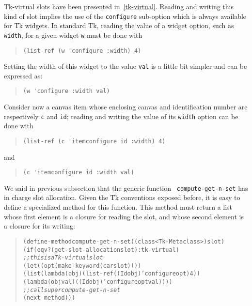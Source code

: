 {Tk-virtual slots have been presented in~\ref{tk-virtual}. Reading and
writing this kind of slot implies the use of the {\tt configure} sub-option
which is always available for Tk widgets. In standard Tk, reading the value
of a widget option, such as {\tt width}, for a given widget {\tt w} must
be done with
\begin{quote}\figsize
\begin{verbatim}
(list-ref (w 'configure :width) 4)
\end{verbatim}
\end{quote}
\noindent
Setting the width of this widget to the value {\tt val} is a little
bit simpler and can be expressed as:
\begin{quote}\figsize
\begin{verbatim}
(w 'configure :width val)
\end{verbatim}
\end{quote}

\noindent
Consider now a canvas item whose enclosing canvas and identification number
are respectively {\tt c} and {\tt id}; reading and writing the value 
of its {\tt width} option can be done with 
\begin{quote}\figsize
\begin{verbatim}
(list-ref (c 'itemconfigure id :width) 4)
\end{verbatim}
\end{quote}
and
\begin{quote}\figsize
\begin{verbatim}
(c 'itemconfigure id :width val)
\end{verbatim}
\end{quote}

\noindent
We said in previous subsection that the generic function {\tt
compute-get-n-set} has in charge slot allocation.  Given the Tk conventions
exposed before, it is easy to define a {\tt <Tk-metaclass>} specialized
method for this function. This method must return a list whose first
element is a closure for reading the slot, and whose second element is a
closure for its writing:

\begin{quote}\figsize
\begin{alltt}
(define-method compute-get-n-set ((class <Tk-Metaclass>) slot)
  (if (eqv? (get-slot-allocation slot) :tk-virtual)
      {\em ;; this is a Tk-virtual slot}
      (let ((opt (make-keyword (car slot))))
        (list (lambda (obj) (list-ref ((Id obj) 'configure opt) 4))
              (lambda (obj val) ((Id obj) 'configure opt val))))
      {\em ;; call super compute-get-n-set}
      (next-method)))
\end{alltt}
\end{quote}

}
